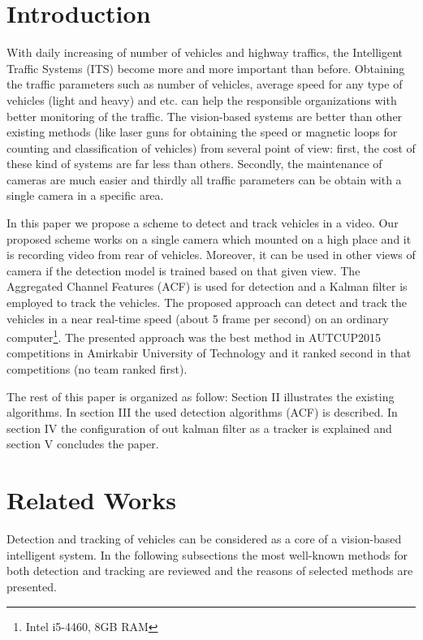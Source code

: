 \documentclass[conference]{IEEEtran}
\begin{document}
\section{Introduction}

With daily increasing of number of vehicles and highway traffics, the Intelligent Traffic Systems (ITS) become more and more important than before. Obtaining the traffic parameters such as number of vehicles, average speed for any type of vehicles (light and heavy) and etc. can help the responsible organizations with better monitoring of the traffic. The vision-based systems are better than other existing methods (like laser guns for obtaining the speed or magnetic loops for counting and classification of vehicles) from several point of view: first, the cost of these kind of systems are far less than others. Secondly, the maintenance of cameras are much easier and thirdly all traffic parameters can be obtain with a single camera in a specific area. 


In this paper we propose a scheme to detect and track vehicles in a video. Our proposed scheme works on a single camera which mounted on a high place and it is recording video from rear of vehicles. Moreover, it can be used in other views of camera if the detection model is trained based on that given view. The Aggregated Channel Features (ACF) is used for detection and a Kalman filter is employed to track the vehicles. The proposed approach can detect and track the vehicles in a near real-time speed (about 5 frame per second) on an ordinary computer\footnote{Intel i5-4460, 8GB RAM}. The presented approach was the best method in AUTCUP2015 competitions in Amirkabir University of Technology and it ranked second in that competitions (no team ranked first).



The rest of this paper is organized as follow: Section II illustrates the existing algorithms. In section III the used detection algorithms (ACF) is described. In section IV the configuration of out kalman filter as a tracker is explained and section V concludes the paper. 
\section{Related Works}
Detection and tracking of vehicles can be considered as a core of a vision-based intelligent system. In the following subsections the most well-known methods for both detection and tracking are reviewed and the reasons of selected methods are presented.
\end{document}
